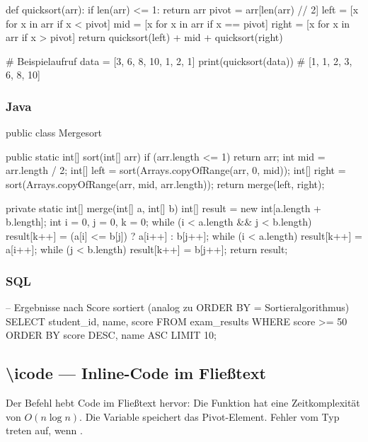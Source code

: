 \begin{syntaxbox}[Python]
def quicksort(arr):
    if len(arr) <= 1:
        return arr
    pivot = arr[len(arr) // 2]
    left  = [x for x in arr if x < pivot]
    mid   = [x for x in arr if x == pivot]
    right = [x for x in arr if x > pivot]
    return quicksort(left) + mid + quicksort(right)

# Beispielaufruf
data = [3, 6, 8, 10, 1, 2, 1]
print(quicksort(data))  # [1, 1, 2, 3, 6, 8, 10]
\end{syntaxbox}

\subsubsection{Java}

\begin{syntaxbox}[Java]
public class Mergesort {

    public static int[] sort(int[] arr) {
        if (arr.length <= 1) return arr;
        int mid = arr.length / 2;
        int[] left  = sort(Arrays.copyOfRange(arr, 0, mid));
        int[] right = sort(Arrays.copyOfRange(arr, mid, arr.length));
        return merge(left, right);
    }

    private static int[] merge(int[] a, int[] b) {
        int[] result = new int[a.length + b.length];
        int i = 0, j = 0, k = 0;
        while (i < a.length && j < b.length)
            result[k++] = (a[i] <= b[j]) ? a[i++] : b[j++];
        while (i < a.length) result[k++] = a[i++];
        while (j < b.length) result[k++] = b[j++];
        return result;
    }
}
\end{syntaxbox}

\subsubsection{SQL}

\begin{syntaxbox}[SQL]
-- Ergebnisse nach Score sortiert (analog zu ORDER BY = Sortieralgorithmus)
SELECT student_id, name, score
FROM   exam_results
WHERE  score >= 50
ORDER  BY score DESC, name ASC
LIMIT  10;
\end{syntaxbox}

\subsection{\textbackslash icode — Inline-Code im Fließtext}

Der Befehl  hebt Code im Fließtext hervor:
Die Funktion  hat eine Zeitkomplexität von $O(n \log n)$.
Die Variable  speichert das Pivot-Element.
Fehler vom Typ  treten auf, wenn .

